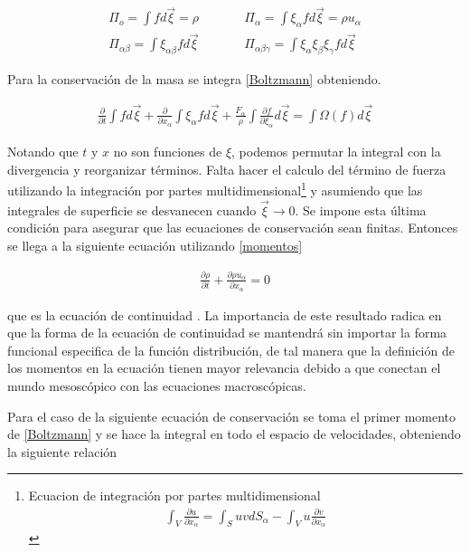 \begin{eqnarray}
\label{momentos}
\Pi_{o} = \int f d\vec{\xi} = \rho &\qquad& \Pi_{\alpha} = \int \xi_{\alpha}f d\vec{\xi} = \rho u_{\alpha}\\
\Pi_{\alpha\beta} = \int \xi_{\alpha\beta}f d\vec{\xi}  &\qquad& \Pi_{\alpha\beta\gamma} = \int \xi_{\alpha}\xi_{\beta}\xi_{\gamma}f d\vec{\xi} \nonumber
\end{eqnarray}

\noindent Para la conservación de la masa se integra \eqref{Boltzmann} obteniendo. 

\begin{eqnarray}
\frac{\partial}{\partial t}\int f d\vec{\xi}+\frac{\partial}{\partial x_{\alpha}}\int \xi_{\alpha}fd\vec{\xi}+\frac{F_{\alpha}}{\rho}\int \frac{\partial f}{\partial \xi_{\alpha}}d\vec{\xi} = \int \Omega(f)d\vec{\xi}
\end{eqnarray}

\noindent Notando que $t$ y $x$ no son funciones de $\xi$, podemos permutar la integral con la divergencia y reorganizar términos. Falta hacer el calculo del término de fuerza utilizando la integración por partes multidimensional\footnote{Ecuacion de integración por partes multidimensional \begin{eqnarray}
\label{partes}
\int_{V} \frac{\partial u}{\partial x_{\alpha}} = \int_{S}uv dS_{\alpha} - \int_{V}u\frac{\partial v}{\partial x_{\alpha}}\nonumber
\end{eqnarray}
} y asumiendo que las integrales de superficie se desvanecen cuando $\vec{\xi}\rightarrow  0$. Se impone esta última condición para asegurar que las ecuaciones de conservación sean finitas. Entonces se llega a la siguiente ecuación utilizando \eqref{momentos}


\begin{eqnarray}
\boxed{\frac{\partial \rho}{\partial t} +\frac{\partial \rho u_{\alpha}}{\partial x_{\alpha}}= 0 }
\end{eqnarray}

\noindent que es la ecuación de continuidad \cite{Landau}. La importancia de este resultado radica en que la forma de la ecuación de continuidad se mantendrá sin importar la forma funcional especifica de la función distribución, de tal manera que la definición de los momentos en la ecuación tienen mayor relevancia debido a que conectan el mundo mesoscópico con las ecuaciones macroscópicas.

\medskip

\noindent Para el caso de la siguiente ecuación de conservación se toma el primer momento de \eqref{Boltzmann} y se hace la integral en todo el espacio de velocidades, obteniendo la siguiente relación 



